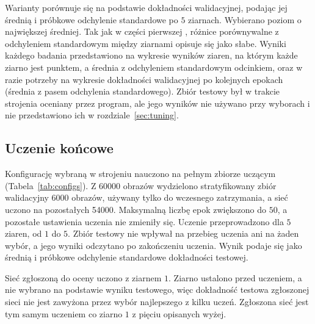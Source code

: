 Warianty porównuje się na podstawie dokładności walidacyjnej, podając jej średnią i próbkowe odchylenie standardowe po $5$ ziarnach. Wybierano poziom o największej średniej. Tak jak w części pierwszej \cite[rozdz.~6.3]{gracikowski2026}, różnice porównywalne z odchyleniem standardowym między ziarnami opisuje się jako słabe. Wyniki każdego badania przedstawiono na wykresie wyników ziaren, na którym każde ziarno jest punktem, a średnia z odchyleniem standardowym odcinkiem, oraz w razie potrzeby na wykresie dokładności walidacyjnej po kolejnych epokach (średnia z pasem odchylenia standardowego). Zbiór testowy był w trakcie strojenia oceniany przez program, ale jego wyników nie używano przy wyborach i nie przedstawiono ich w rozdziale~\ref{sec:tuning}.

\subsection{Uczenie końcowe}
\label{sec:methodology-final}

Konfigurację wybraną w strojeniu nauczono na pełnym zbiorze uczącym (Tabela~\ref{tab:configs}). Z \num{60000} obrazów wydzielono stratyfikowany zbiór walidacyjny \num{6000} obrazów, używany tylko do wczesnego zatrzymania, a sieć uczono na pozostałych \num{54000}. Maksymalną liczbę epok zwiększono do $50$, a pozostałe ustawienia uczenia nie zmieniły się. Uczenie przeprowadzono dla $5$ ziaren, od $1$ do $5$. Zbiór testowy nie wpływał na przebieg uczenia ani na żaden wybór, a jego wyniki odczytano po zakończeniu uczenia. Wynik podaje się jako średnią i próbkowe odchylenie standardowe dokładności testowej.

Sieć zgłoszoną do oceny uczono z ziarnem $1$. Ziarno ustalono przed uczeniem, a nie wybrano na podstawie wyniku testowego, więc dokładność testowa zgłoszonej sieci nie jest zawyżona przez wybór najlepszego z kilku uczeń. Zgłoszona sieć jest tym samym uczeniem co ziarno $1$ z pięciu opisanych wyżej.
